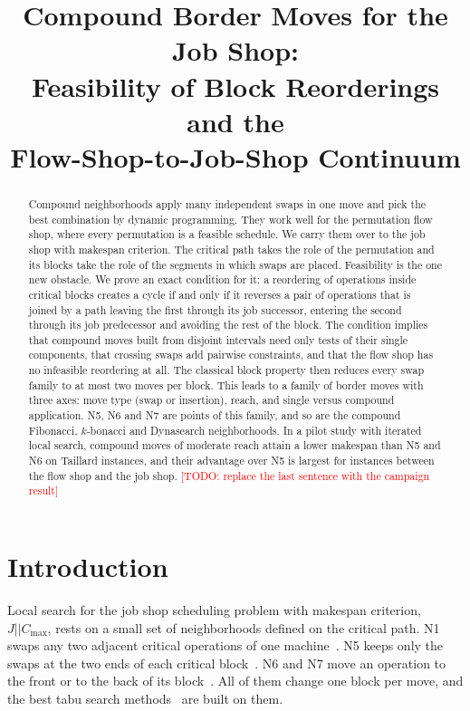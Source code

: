 \documentclass[10pt,twocolumn]{article}
\title{Compound Border Moves for the Job Shop:\\
Feasibility of Block Reorderings and the\\
Flow-Shop-to-Job-Shop Continuum}
\author{\todo{authors}}
\date{}
\newcommand{\todo}[1]{\textcolor{red}{[TODO: #1]}}
\newcommand{\Cmax}{C_{\max}}
\begin{document}
\maketitle

\begin{abstract}
Compound neighborhoods apply many independent swaps in one move and pick
the best combination by dynamic programming. They work well for the
permutation flow shop, where every permutation is a feasible schedule. We
carry them over to the job shop with makespan criterion. The critical path
takes the role of the permutation and its blocks take the role of the
segments in which swaps are placed. Feasibility is the one new obstacle. We
prove an exact condition for it: a reordering of operations inside critical
blocks creates a cycle if and only if it reverses a pair of operations that
is joined by a path leaving the first through its job successor, entering
the second through its job predecessor and avoiding the rest of the block.
The condition implies that compound moves built from disjoint intervals
need only tests of their single components, that crossing swaps add
pairwise constraints, and that the flow shop has no infeasible reordering
at all. The classical block property then reduces every swap family to at
most two moves per block. This leads to a family of border moves with three
axes: move type (swap or insertion), reach, and single versus compound
application. N5, N6 and N7 are points of this family, and so are the
compound Fibonacci, $k$-bonacci and Dynasearch neighborhoods. In a pilot
study with iterated local search, compound moves of moderate reach attain a
lower makespan than N5 and N6 on Taillard instances, and their advantage
over N5 is largest for instances between the flow shop and the job shop.
\todo{replace the last sentence with the campaign result}
\end{abstract}

\section{Introduction}

Local search for the job shop scheduling problem with makespan criterion,
$J||\Cmax$, rests on a small set of neighborhoods defined on the critical
path. N1 swaps any two adjacent critical operations of one
machine~\cite{laarhoven1992}. N5 keeps only the swaps at the two ends of
each critical block~\cite{nowicki1996}. N6 and N7 move an operation to the
front or to the back of its block~\cite{balas1998,zhang2007}. All of them
change one block per move, and the best tabu search
methods~\cite{nowicki2005,peng2015} are built on them.
\end{document}
